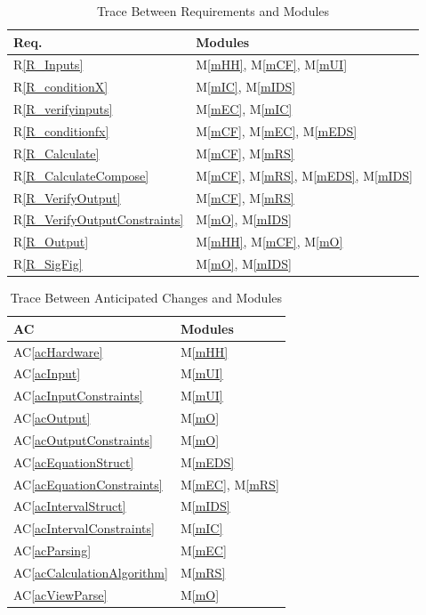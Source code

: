 \documentclass[12pt, titlepage]{article}
\newcommand{\rref}[1]{R\ref{#1}}
\newcommand{\acref}[1]{AC\ref{#1}}
\newcommand{\mref}[1]{M\ref{#1}}
\begin{document}
\begin{table}[H]
\centering
\begin{tabular}{p{} p{}}
\toprule
\textbf{Req.} & \textbf{Modules}\\
\midrule
\rref{R_Inputs} & \mref{mHH}, \mref{mCF}, \mref{mUI}\\
\rref{R_conditionX} & \mref{mIC}, \mref{mIDS}\\
\rref{R_verifyinputs} & \mref{mEC}, \mref{mIC}\\
\rref{R_conditionfx} & \mref{mCF}, \mref{mEC}, \mref{mEDS}\\
\rref{R_Calculate} & \mref{mCF}, \mref{mRS}\\
\rref{R_CalculateCompose} & \mref{mCF}, \mref{mRS}, \mref{mEDS}, \mref{mIDS}\\
\rref{R_VerifyOutput} & \mref{mCF}, \mref{mRS}\\
\rref{R_VerifyOutputConstraints} & \mref{mO}, \mref{mIDS}\\
\rref{R_Output} & \mref{mHH}, \mref{mCF}, \mref{mO}\\
\rref{R_SigFig} & \mref{mO}, \mref{mIDS}\\
\bottomrule
\end{tabular}
\caption{Trace Between Requirements and Modules}
\label{TblRT}
\end{table}

\begin{table}[H]
\centering
\begin{tabular}{p{} p{}}
\toprule
\textbf{AC} & \textbf{Modules}\\
\midrule
\acref{acHardware} & \mref{mHH}\\
\acref{acInput} & \mref{mUI}\\
\acref{acInputConstraints} & \mref{mUI}\\
\acref{acOutput} & \mref{mO}\\
\acref{acOutputConstraints} & \mref{mO}\\
\acref{acEquationStruct} & \mref{mEDS}\\
\acref{acEquationConstraints} & \mref{mEC}, \mref{mRS}\\
\acref{acIntervalStruct} & \mref{mIDS}\\
\acref{acIntervalConstraints} & \mref{mIC}\\
\acref{acParsing} & \mref{mEC}\\
\acref{acCalculationAlgorithm} & \mref{mRS}\\
\acref{acViewParse} & \mref{mO}\\
\bottomrule
\end{tabular}
\caption{Trace Between Anticipated Changes and Modules}
\label{TblACT}
\end{table}
\end{document}
